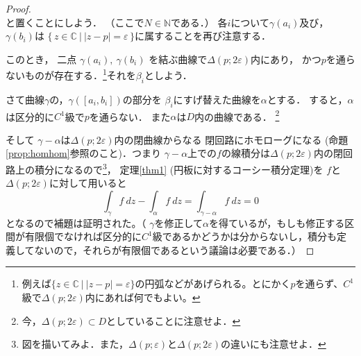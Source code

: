 \documentclass[leqno, 12pt, a4paper]{jsarticle}
\newcommand{\nn}{\mathbb{N}}
\newcommand{\cc}{\mathbb{C}}
\newcommand{\ep}{\varepsilon}
\begin{document}
\begin{proof}
\[\]
と置くことにしよう．
（ここで$N\in \nn$である．）
各$i$について$\gamma(a_i)$及び，
$\gamma(b_i)$は
$\{\, z\in \cc\ |\ |z-p|=\ep \, \}$に属することを再び注意する．\par
このとき，
二点
$\gamma(a_i),\ \gamma(b_i)$
を結ぶ曲線で$\Delta(p; 2\ep)$内にあり，
かつ$p$を通らないものが存在する．\footnote{例えば$\{z\in \cc\ |\ |z-p|=\ep \}$の円弧などがあげられる。とにかく$p$を通らず、$C^1$級で$\Delta(p;2\ep)$内にあれば何でもよい。}それを$\beta_{i}$としよう．
\par
さて曲線$\gamma$の，$\gamma([a_i,b_i])$の部分を
$\beta_{i}$にすげ替えた曲線を$\alpha$とする．
すると，$\alpha$は区分的に$C^1$級で$p$を通らない．
また$\alpha$は$D$内の曲線である．
\footnote{今，$\Delta(p;2\ep)\subset D$としていることに注意せよ．}
\par
そして
$\gamma-\alpha$は$\Delta(p; 2\ep)$内の閉曲線からなる
閉回路にホモローグになる (命題 \ref{prop:homhom}参照のこと)．つまり
$\gamma-\alpha$上での$f$の線積分は$\Delta(p;2\ep)$内の閉回路上の積分になるので\footnote{図を描いてみよ．また，$\Delta(p;\ep)$と$\Delta(p;2\ep)$の違いにも注意せよ．}，
定理\ref{thm1} (円板に対するコーシー積分定理)を
$f$と
$\Delta(p;2\varepsilon)$に対して用いると
\[
\int_{\gamma}f\ dz -\int_{\alpha}f\ dz=\int_{\gamma-\alpha}f\ dz=0
\]
となるので補題は証明された。（
$\gamma$を修正して$\alpha$を得ているが，もしも修正する区間が有限個でなければ区分的に$C^1$級であるかどうかは分からないし，積分も定義してないので，それらが有限個であるという議論は必要である．）
\end{proof}
\end{document}
